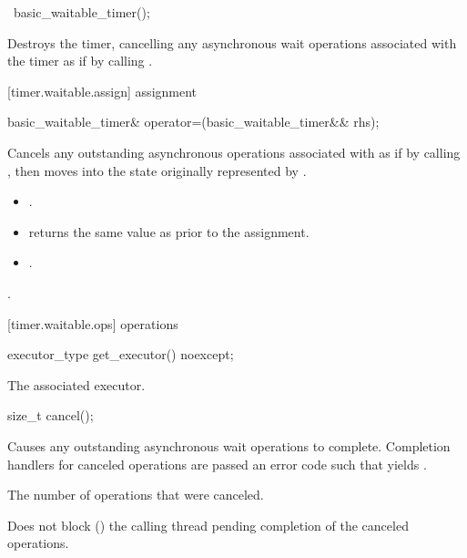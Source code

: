 \begin{itemdecl}
~basic_waitable_timer();
\end{itemdecl}

\begin{itemdescr}
\pnum
\effects Destroys the timer, cancelling any asynchronous wait operations associated with the timer as if by calling .
\end{itemdescr}



[timer.waitable.assign]{ assignment}

\begin{itemdecl}
basic_waitable_timer& operator=(basic_waitable_timer&& rhs);
\end{itemdecl}

\begin{itemdescr}
\pnum
\effects Cancels any outstanding asynchronous operations associated with  as if by calling , then moves into  the state originally represented by .

\pnum
\postconditions 
\begin{itemize}
\item
{}.
\item
{} returns the same value as  prior to the assignment.
\item
{}.
\end{itemize}

\pnum
\returns {}.
\end{itemdescr}



[timer.waitable.ops]{ operations}

\begin{itemdecl}
executor_type get_executor() noexcept;
\end{itemdecl}

\begin{itemdescr}
\pnum
\returns The associated executor.
\end{itemdescr}

\begin{itemdecl}
size_t cancel();
\end{itemdecl}

\begin{itemdescr}
\pnum
\effects Causes any outstanding asynchronous wait operations to complete. Completion handlers for canceled operations are passed an error code  such that  yields .

\pnum
\returns The number of operations that were canceled.

\pnum
\remarks Does not block () the calling thread pending completion of the canceled operations.
\end{itemdescr}

